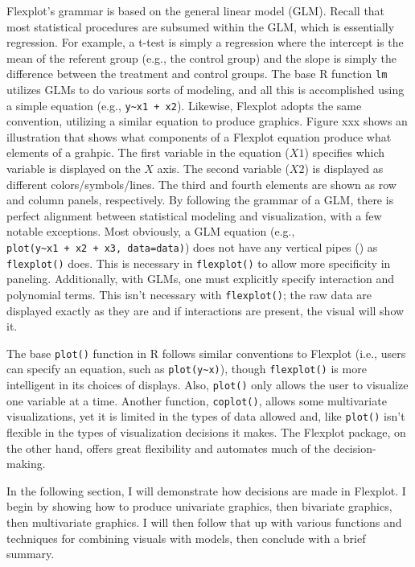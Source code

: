 \documentclass[,]{book}
\begin{document}
Flexplot's grammar is based on the general linear model (GLM). Recall
that most statistical procedures are subsumed within the GLM, which is
essentially regression. For example, a t-test is simply a regression
where the intercept is the mean of the referent group (e.g., the control
group) and the slope is simply the difference between the treatment and
control groups. The base R function \texttt{lm} utilizes GLMs to do
various sorts of modeling, and all this is accomplished using a simple
equation (e.g., \texttt{y\textasciitilde{}x1\ +\ x2}). Likewise,
Flexplot adopts the same convention, utilizing a similar equation to
produce graphics. Figure xxx shows an illustration that shows what
components of a Flexplot equation produce what elements of a grahpic.
The first variable in the equation (\(X1\)) specifies which variable is
displayed on the \(X\) axis. The second variable (\(X2\)) is displayed
as different colors/symbols/lines. The third and fourth elements are
shown as row and column panels, respectively. By following the grammar
of a GLM, there is perfect alignment between statistical modeling and
visualization, with a few notable exceptions. Most obviously, a GLM
equation (e.g.,
\texttt{plot(y\textasciitilde{}x1\ +\ x2\ +\ x3,\ data=data)}) does not
have any vertical pipes (\texttt{\textbar{}}) as \texttt{flexplot()}
does. This is necessary in \texttt{flexplot()} to allow more specificity
in paneling. Additionally, with GLMs, one must explicitly specify
interaction and polynomial terms. This isn't necessary with
\texttt{flexplot()}; the raw data are displayed exactly as they are and
if interactions are present, the visual will show it.

The base \texttt{plot()} function in R follows similar conventions to
Flexplot (i.e., users can specify an equation, such as
\texttt{plot(y\textasciitilde{}x)}), though \texttt{flexplot()} is more
intelligent in its choices of displays. Also, \texttt{plot()} only
allows the user to visualize one variable at a time. Another function,
\texttt{coplot()}, allows some multivariate visualizations, yet it is
limited in the types of data allowed and, like \texttt{plot()} isn't
flexible in the types of visualization decisions it makes. The Flexplot
package, on the other hand, offers great flexibility and automates much
of the decision-making.

In the following section, I will demonstrate how decisions are made in
Flexplot. I begin by showing how to produce univariate graphics, then
bivariate graphics, then multivariate graphics. I will then follow that
up with various functions and techniques for combining visuals with
models, then conclude with a brief summary.
\end{document}
